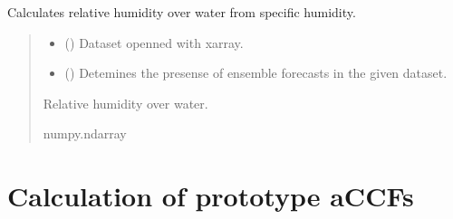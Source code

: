 \documentclass[a4paper,11pt,english]{sphinxmanual}
\begin{document}
\begin{fulllineitems}
\label{\detokenize{modules:envlib.contrail.get_rw_from_specific_hum}}
\pysigstartsignatures
{}
\pysigstopsignatures
\sphinxAtStartPar
Calculates relative humidity over water from specific humidity.
\begin{quote}\begin{description}
\begin{itemize}
\item {} 
\sphinxAtStartPar
{} () \textendash{} Dataset openned with xarray.

\item {} 
\sphinxAtStartPar
{} () \textendash{} Detemines the presense of ensemble forecasts in the given dataset.

\end{itemize}

\sphinxAtStartPar
Relative humidity over water.

\sphinxAtStartPar
numpy.ndarray

\end{description}\end{quote}

\end{fulllineitems}



\section{Calculation of prototype aCCFs}
\label{\detokenize{modules:calculation-of-prototype-accfs}}
\end{document}
